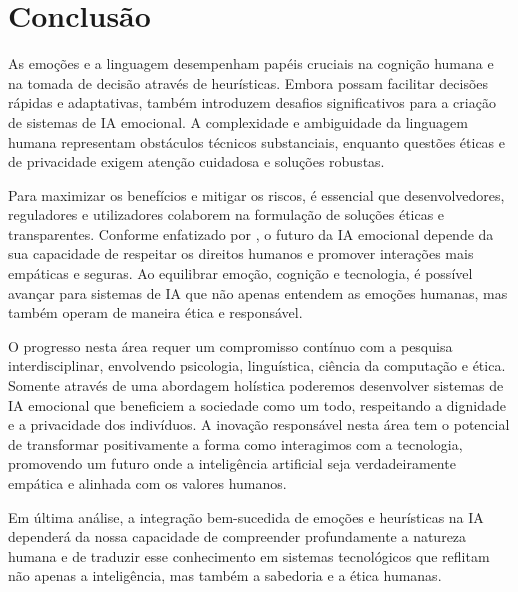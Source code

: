\documentclass[a4paper,12pt]{report}
\begin{document}
	\section{Conclusão}
	
	As emoções e a linguagem desempenham papéis cruciais na cognição humana e na tomada de decisão através de heurísticas. Embora possam facilitar decisões rápidas e adaptativas, também introduzem desafios significativos para a criação de sistemas de IA emocional. A complexidade e ambiguidade da linguagem humana representam obstáculos técnicos substanciais, enquanto questões éticas e de privacidade exigem atenção cuidadosa e soluções robustas.
	
	Para maximizar os benefícios e mitigar os riscos, é essencial que desenvolvedores, reguladores e utilizadores colaborem na formulação de soluções éticas e transparentes. Conforme enfatizado por \textcite{russell2020}, o futuro da IA emocional depende da sua capacidade de respeitar os direitos humanos e promover interações mais empáticas e seguras. Ao equilibrar emoção, cognição e tecnologia, é possível avançar para sistemas de IA que não apenas entendem as emoções humanas, mas também operam de maneira ética e responsável.
	
	O progresso nesta área requer um compromisso contínuo com a pesquisa interdisciplinar, envolvendo psicologia, linguística, ciência da computação e ética. Somente através de uma abordagem holística poderemos desenvolver sistemas de IA emocional que beneficiem a sociedade como um todo, respeitando a dignidade e a privacidade dos indivíduos. A inovação responsável nesta área tem o potencial de transformar positivamente a forma como interagimos com a tecnologia, promovendo um futuro onde a inteligência artificial seja verdadeiramente empática e alinhada com os valores humanos.
	
	Em última análise, a integração bem-sucedida de emoções e heurísticas na IA dependerá da nossa capacidade de compreender profundamente a natureza humana e de traduzir esse conhecimento em sistemas tecnológicos que reflitam não apenas a inteligência, mas também a sabedoria e a ética humanas.
	
	\newpage
	
	\printbibliography
	
\end{document}
